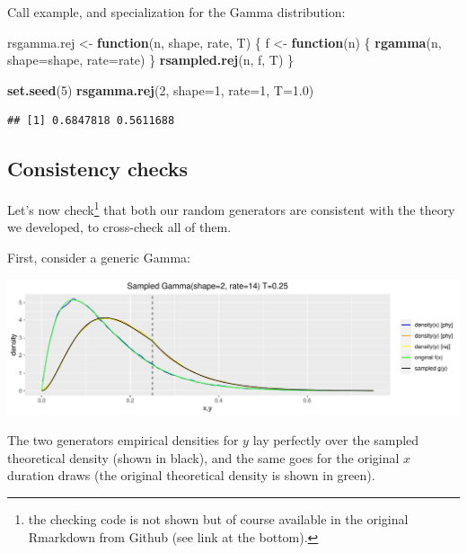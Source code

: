 \documentclass[]{article}
\newenvironment{Shaded}{\begin{snugshade}}{\end{snugshade}}
\newcommand{\ControlFlowTok}[1]{\textcolor[rgb]{0.13,0.29,0.53}{\textbf{#1}}}
\newcommand{\DataTypeTok}[1]{\textcolor[rgb]{0.13,0.29,0.53}{#1}}
\newcommand{\DecValTok}[1]{\textcolor[rgb]{0.00,0.00,0.81}{#1}}
\newcommand{\FloatTok}[1]{\textcolor[rgb]{0.00,0.00,0.81}{#1}}
\newcommand{\KeywordTok}[1]{\textcolor[rgb]{0.13,0.29,0.53}{\textbf{#1}}}
\newcommand{\NormalTok}[1]{#1}
\newcommand{\StringTok}[1]{\textcolor[rgb]{0.31,0.60,0.02}{#1}}
\begin{document}
Call example, and specialization for the Gamma distribution:

\begin{Shaded}
\begin{Highlighting}[]
\NormalTok{rsgamma.rej <-}\StringTok{ }\ControlFlowTok{function}\NormalTok{(n, shape, rate, T) \{}
\NormalTok{  f <-}\StringTok{ }\ControlFlowTok{function}\NormalTok{(n) \{}
    \KeywordTok{rgamma}\NormalTok{(n, }\DataTypeTok{shape=}\NormalTok{shape, }\DataTypeTok{rate=}\NormalTok{rate)}
\NormalTok{  \}}
  \KeywordTok{rsampled.rej}\NormalTok{(n, f, T)}
\NormalTok{\}}

\KeywordTok{set.seed}\NormalTok{(}\DecValTok{5}\NormalTok{)}
\KeywordTok{rsgamma.rej}\NormalTok{(}\DecValTok{2}\NormalTok{, }\DataTypeTok{shape=}\DecValTok{1}\NormalTok{, }\DataTypeTok{rate=}\DecValTok{1}\NormalTok{, }\DataTypeTok{T=}\FloatTok{1.0}\NormalTok{)}
\end{Highlighting}
\end{Shaded}

\begin{verbatim}
## [1] 0.6847818 0.5611688
\end{verbatim}

\hypertarget{consistency-checks}{%
\subsection{Consistency checks}\label{consistency-checks}}

Let's now check\footnote{the checking code is not shown but of course
  available in the original Rmarkdown from Github (see link at the
  bottom).} that both our random generators are consistent with the
theory we developed, to cross-check all of them.

First, consider a generic Gamma:

\begin{center}\includegraphics[width=1.0\textwidth]{sampling_event_duration_files/figure-latex/cons_check_nice_colorful-1} \end{center}

The two generators empirical densities for \(y\) lay perfectly over the
sampled theoretical density (shown in black), and the same goes for the
original \(x\) duration draws (the original theoretical density is shown
in green).
\end{document}
